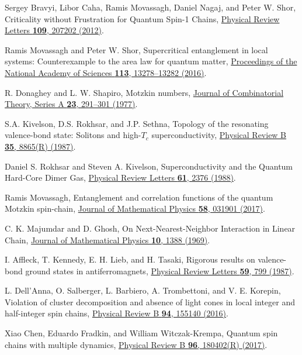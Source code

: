 \documentclass[aps,pra,twocolumn,groupaddress,showpacs]{revtex4-1}
\newcommand{\linkdoi}[2]{\href{http://dx.doi.org/#2}{#1}}
\begin{document}
\begin{thebibliography}{99}

 Sergey Bravyi, Libor Caha, 
Ramis Movassagh, Daniel Nagaj, and Peter W. Shor,
Criticality without Frustration for Quantum Spin-1 Chains,
\linkdoi{Physical Review Letters {\bf 109}, 207202 (2012)}
{10.1103/PhysRevLett.109.207202}.

Ramis Movassagh and Peter W. Shor, 
Supercritical entanglement in local systems: Counterexample to the area law for quantum matter,
\linkdoi{Proceedings of the National Academy of Sciences {\bf 113}, 13278--13282 (2016)}
{10.1073/pnas.1605716113}.

R. Donaghey and L. W. Shapiro,
Motzkin numbers,
\linkdoi{Journal of Combinatorial Theory, Series A {\bf 23}, 291--301 (1977)}
{10.1016/0097-3165(77)90020-6}.

S.A. Kivelson, D.S. Rokhsar, and J.P. Sethna,
Topology of the resonating valence-bond state: Solitons and high-$T_c$ superconductivity,
\linkdoi{Physical Review B {\bf 35}, 8865(R) (1987)}
{10.1103/PhysRevB.35.8865}.

Daniel S. Rokhsar and Steven A. Kivelson,
Superconductivity and the Quantum Hard-Core Dimer Gas,
\linkdoi{Physical Review Letters {\bf 61}, 2376 (1988)}
{10.1103/PhysRevLett.61.2376}.

Ramis Movassagh,
Entanglement and correlation functions of the quantum Motzkin spin-chain,
\linkdoi{Journal of Mathematical Physics {\bf 58}, 031901 (2017)}
{10.1063/1.4977829}.

C. K. Majumdar and D. Ghosh, 
On Next-Nearest-Neighbor Interaction in Linear Chain,
\linkdoi{Journal of Mathematical Physics {\bf 10}, 1388 (1969)}
{10.1063/1.1664978}.

I. Affleck, T. Kennedy, E. H. Lieb, and H. Tasaki,
Rigorous results on valence-bond ground states in antiferromagnets,
\linkdoi{Physical Review Letters {\bf 59}, 799 (1987)}
{10.1103/PhysRevLett.59.799}.

L. Dell'Anna, O. Salberger,  L. Barbiero, A. Trombettoni, and V. E. Korepin,
Violation of cluster decomposition and absence of light cones in local integer and half-integer spin chains,
\linkdoi{Physical Review B {\bf 94}, 155140 (2016)}
{10.1103/PhysRevB.94.155140}.

Xiao Chen, Eduardo Fradkin, and William Witczak-Krempa,
Quantum spin chains with multiple dynamics,
\linkdoi{Physical Review B {\bf 96}, 180402(R) (2017)}
{10.1103/PhysRevB.96.180402}.


\end{thebibliography}
\end{document}
